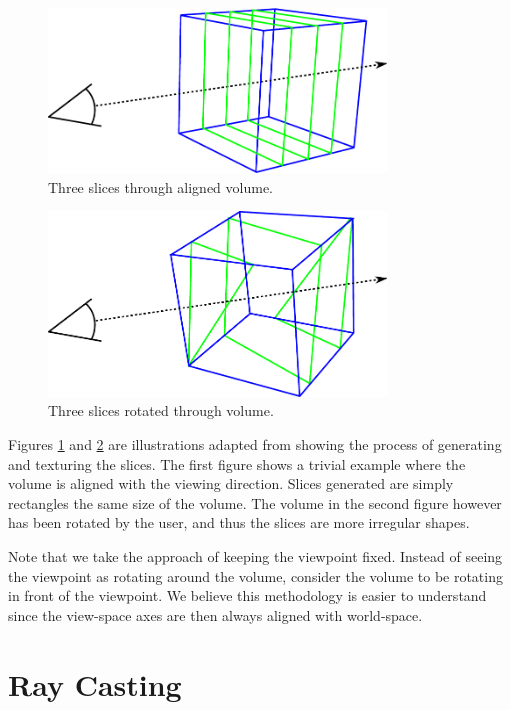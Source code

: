 \documentclass{report}
\begin{document}
\begin{figure}
\centering
\includegraphics[width=0.8\textwidth]{slicing-aligned.pdf}
\caption{Three slices through aligned volume.}
\label{slicing-aligned}
\end{figure}

\begin{figure}
\centering
\includegraphics[width=0.8\textwidth]{slicing-rotated.pdf}
\caption{Three slices rotated through volume.}
\label{slicing-rotated}
\end{figure}

Figures \ref{slicing-aligned} and \ref{slicing-rotated} are illustrations
adapted from \cite{Ikits04} showing the process of generating and texturing the
slices.  The first figure shows a trivial example where the volume is aligned
with the viewing direction.  Slices generated are simply rectangles the same
size of the volume.  The volume in the second figure however has been rotated by
the user, and thus the slices are more irregular shapes.

Note that we take the approach of keeping the viewpoint fixed.  Instead of
seeing the viewpoint as rotating around the volume, consider the volume to be
rotating in front of the viewpoint.  We believe this methodology is easier to
understand since the view-space axes are then always aligned with world-space.

\chapter{Ray Casting}
\end{document}
